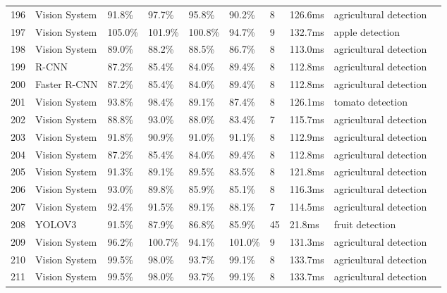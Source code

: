 \begin{table*}[htbp]
\begin{tabular}{p{}p{}p{}p{}p{}p{}p{}p{}p{}p{}}
 196 & Vision System & 91.8\% & 97.7\% & 95.8\% & 90.2\% & 8 & 126.6ms & agricultural detection & \cite{mark2019ethics} \\
 197 & Vision System & 105.0\% & 101.9\% & 100.8\% & 94.7\% & 9 & 132.7ms & apple detection & \cite{pourdarbani2020automatic} \\
 198 & Vision System & 89.0\% & 88.2\% & 88.5\% & 86.7\% & 8 & 113.0ms & agricultural detection & \cite{girshick2014rcnn} \\
 199 & R-CNN & 87.2\% & 85.4\% & 84.0\% & 89.4\% & 8 & 112.8ms & agricultural detection & \cite{girshick2015fast} \\
 200 & Faster R-CNN & 87.2\% & 85.4\% & 84.0\% & 89.4\% & 8 & 112.8ms & agricultural detection & \cite{ren2015faster} \\
 201 & Vision System & 93.8\% & 98.4\% & 89.1\% & 87.4\% & 8 & 126.1ms & tomato detection & \cite{feng2018} \\
 202 & Vision System & 88.8\% & 93.0\% & 88.0\% & 83.4\% & 7 & 115.7ms & agricultural detection & \cite{borenstein1991vfh} \\
 203 & Vision System & 91.8\% & 90.9\% & 91.0\% & 91.1\% & 8 & 112.9ms & agricultural detection & \cite{fox1997dynamic} \\
 204 & Vision System & 87.2\% & 85.4\% & 84.0\% & 89.4\% & 8 & 112.8ms & agricultural detection & \cite{lillicrap2015continuous} \\
 205 & Vision System & 91.3\% & 89.1\% & 89.5\% & 83.5\% & 8 & 121.8ms & agricultural detection & \cite{hart1968formal} \\
 206 & Vision System & 93.0\% & 89.8\% & 85.9\% & 85.1\% & 8 & 116.3ms & agricultural detection & \cite{lavalle1998rapidly} \\
 207 & Vision System & 92.4\% & 91.5\% & 89.1\% & 88.1\% & 7 & 114.5ms & agricultural detection & \cite{dijkstra1959note} \\
 208 & YOLOV3 & 91.5\% & 87.9\% & 86.8\% & 85.9\% & 45 & 21.8ms & fruit detection & \cite{xu2019real} \\
 209 & Vision System & 96.2\% & 100.7\% & 94.1\% & 101.0\% & 9 & 131.3ms & agricultural detection & \cite{gruda2024three} \\
 210 & Vision System & 99.5\% & 98.0\% & 93.7\% & 99.1\% & 8 & 133.7ms & agricultural detection & \cite{Ahmad:2023_bnb} \\
 211 & Vision System & 99.5\% & 98.0\% & 93.7\% & 99.1\% & 8 & 133.7ms & agricultural detection & \cite{Loganathan:2023_hho} \\

\end{tabular}
\end{table*}
